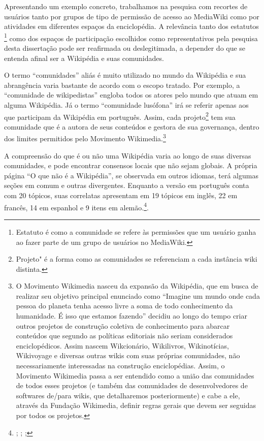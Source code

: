 Apresentando um exemplo concreto, trabalhamos na pesquisa com recortes de usuários tanto por grupos de tipo de permissão de acesso ao MediaWiki como por atividades em diferentes espaços da enciclopédia. A relevância tanto dos estatutos \footnote{Estatuto é como a comunidade se refere às permissões que um usuário ganha ao fazer parte de um grupo de usuários no MediaWiki.} como dos espaços de participação escolhidos como representativos pela pesquisa desta dissertação pode ser reafirmada ou deslegitimada, a depender do que se entenda afinal ser a Wikipédia e suas comunidades.

O termo ``comunidades'' aliás é muito utilizado no mundo da Wikipédia e sua abrangência varia bastante de acordo com o escopo tratado. Por exemplo, a ``comunidade de wikipedistas'' engloba todos os atores pelo mundo que atuam em alguma Wikipédia. Já o termo ``comunidade lusófona'' irá se referir apenas aos que participam da Wikipédia em português. Assim, cada projeto\footnote{Projeto" é a forma como as comunidades se referenciam a cada instância wiki distinta.} tem sua comunidade que é a autora de seus conteúdos e gestora de sua governança, dentro dos limites permitidos pelo Movimento Wikimedia.\footnote{O Movimento Wikimedia nasceu da expansão da Wikipédia, que em busca de realizar seu objetivo principal enunciado como ``Imagine um mundo onde cada pessoa do planeta tenha acesso livre a soma de todo conhecimento da humanidade. É isso que estamos fazendo'' decidiu ao longo do tempo criar outros projetos de construção coletiva de conhecimento para abarcar conteúdos que segundo as políticas editoriais não seriam considerados enciclopédicos. Assim nascem Wikcionário, Wikilivros, Wikinotícias, Wikivoyage e diversas outras wikis com suas próprias comunidades, não necessariamente interessadas na construção enciclopédias. Assim, o Movimento Wikimedia passa a ser entendido como a união das comunidades de todos esses projetos (e também das comunidades de desenvolvedores de softwares de/para wikis, que detalharemos posteriormente) e cabe a ele, através da Fundação Wikimedia, definir regras gerais que devem ser seguidas por todos os projetos.}

A compreensão do que é ou não uma Wikipédia varia ao longo de suas diversas comunidades, e pode encontrar consensos locais que não sejam globais. A própria página “O que não é a Wikipédia”, se observada em outros idiomas, terá algumas seções em comum e outras divergentes. Enquanto a versão em português conta com 20 tópicos, suas correlatas apresentam em 19 tópicos em inglês, 22 em francês, 14 em espanhol e 9 itens em alemão.\footnote{ ; ; ; }. 

